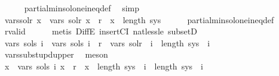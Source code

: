 \begin{isabellebody}
\ \ \ \ \isamarkupfalse%
\ partial{\isacharunderscore}{\kern0pt}min{\isacharunderscore}{\kern0pt}sol{\isacharunderscore}{\kern0pt}one{\isacharunderscore}{\kern0pt}ineq{\isacharunderscore}{\kern0pt}def\ \isamarkupfalse%
\ simp\isanewline
\ \ \isamarkupfalse%
\ \isamarkupfalse%
\ vars{\isacharunderscore}{\kern0pt}sol{\isacharunderscore}{\kern0pt}r{\isacharcolon}{\kern0pt}\ {\isachardoublequoteopen}{\isasymforall}x\ {\isasymin}\ vars\ sol{\isacharunderscore}{\kern0pt}r{\isachardot}{\kern0pt}\ x\ {\isachargreater}{\kern0pt}\ r\ {\isasymand}\ x\ {\isacharless}{\kern0pt}\ length\ sys{\isachardoublequoteclose}\isanewline
\ \ \ \ \isamarkupfalse%
\ partial{\isacharunderscore}{\kern0pt}min{\isacharunderscore}{\kern0pt}sol{\isacharunderscore}{\kern0pt}one{\isacharunderscore}{\kern0pt}ineq{\isacharunderscore}{\kern0pt}def\ \isamarkupfalse%
\ r{\isacharunderscore}{\kern0pt}valid\isanewline
\ \ \ \ \isamarkupfalse%
\ {\isacharparenleft}{\kern0pt}metis\ DiffE\ insertCI\ nat{\isacharunderscore}{\kern0pt}less{\isacharunderscore}{\kern0pt}le\ subsetD{\isacharparenright}{\kern0pt}\isanewline
\ \ \isamarkupfalse%
\ \isamarkupfalse%
\ {\isachardoublequoteopen}vars\ {\isacharparenleft}{\kern0pt}sols{\isacharprime}{\kern0pt}\ i{\isacharparenright}{\kern0pt}\ {\isasymsubseteq}\ vars\ {\isacharparenleft}{\kern0pt}sols\ i{\isacharparenright}{\kern0pt}\ {\isacharminus}{\kern0pt}\ {\isacharbraceleft}{\kern0pt}r{\isacharbraceright}{\kern0pt}\ {\isasymunion}\ vars\ sol{\isacharunderscore}{\kern0pt}r{\isachardoublequoteclose}\ \ {\isachardoublequoteopen}i\ {\isacharless}{\kern0pt}\ length\ sys{\isachardoublequoteclose}\ \ i\isanewline
\ \ \ \ \isamarkupfalse%
\ vars{\isacharunderscore}{\kern0pt}subst{\isacharunderscore}{\kern0pt}upd{\isacharunderscore}{\kern0pt}upper\ \isamarkupfalse%
\ meson\isanewline
\ \ \isamarkupfalse%
\ \isamarkupfalse%
\ {\isachardoublequoteopen}{\isasymforall}x\ {\isasymin}\ vars\ {\isacharparenleft}{\kern0pt}sols{\isacharprime}{\kern0pt}\ i{\isacharparenright}{\kern0pt}{\isachardot}{\kern0pt}\ x\ {\isachargreater}{\kern0pt}\ r\ {\isasymand}\ x\ {\isacharless}{\kern0pt}\ length\ sys{\isachardoublequoteclose}\ \ {\isachardoublequoteopen}i\ {\isacharless}{\kern0pt}\ length\ sys{\isachardoublequoteclose}\ \ i\isanewline

\end{isabellebody}
